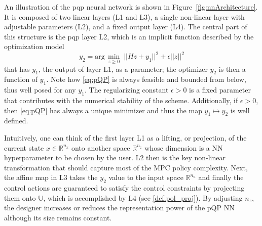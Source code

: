 An illustration of the \ac{pqp} neural network is shown in Figure~\ref{fig:nnArchitecture}. It is composed of two linear layers (L1 and L3), a single non-linear layer with adjustable parameters (L2), and a fixed output layer (L4). The central part of this structure is the \ac{pqp} layer L2, which is an implicit function described by the optimization model
\begin{equation}
	\label{eq:pQP}
	y_2 = \text{arg}\,\min_{z \geq 0} \; ||Hz + y_1||^{2} + \epsilon ||z||^2
\end{equation}
that has $y_1$, the output of layer L1, as a parameter; the optimizer $y_2$ is then a function of $y_1$. Note how \eqref{eq:pQP} is always feasible and bounded from below, thus well posed for any $y_1$. The regularizing constant $\epsilon > 0$ is a fixed parameter that contributes with the numerical stability of the scheme. Additionally, if $\epsilon > 0$, then \eqref{eq:pQP} has always a unique minimizer and thus the map $y_1 \mapsto y_2$ is well defined.

Intuitively, one can think of the first layer L1 as a lifting, or projection, of the current state $x \in \mathbb{R}^{n_x}$ onto another space $\mathbb{R}^{n_z}$ whose dimension is a NN hyperparameter to be chosen by the user. L2 then is the key non-linear transformation that should capture most of the MPC policy complexity. Next, the affine map in L3 takes the $y_2$ value to the input space $\mathbb{R}^{n_u}$ and finally the control actions are guaranteed to satisfy the control constraints by projecting them onto $\mathbb{U}$, which is accomplished by L4 (see \eqref{def.pol_proj}). By adjusting $n_z$, the designer increases or reduces the representation power of the pQP NN although its size remains constant.

